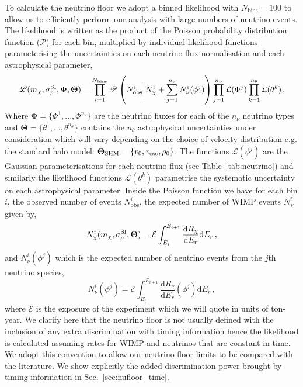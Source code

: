 To calculate the neutrino floor we adopt a binned likelihood with $N_\textrm{bins}=100$ to allow us to efficiently perform our analysis with large numbers of neutrino events. The likelihood is written as the product of the Poisson probability distribution function ($\mathscr{P}$) for each bin, multiplied by individual likelihood functions parameterising the uncertainties on each neutrino flux normalisation and each astrophysical parameter,
\begin{align}\label{eq:likelihood}
 \mathscr{L}(m_\chi,\sigma^{\rm SI}_p,\boldsymbol{\Phi},\boldsymbol{\Theta}) = \prod_{i=1}^{N_\textrm{bins}} \mathscr{P} \left(N_\textrm{obs}^i \bigg| N^i_\chi + \sum_{j=1}^{n_\nu} N^{i}_\nu(\phi^j)\right) 
\prod_{j=1}^{n_\nu} \mathcal{L}(\Phi^j)
\prod_{k=1}^{n_\theta} \mathcal{L}(\theta^k) \, .
\end{align}
Where $\boldsymbol{\Phi} = \{ \Phi^1, ..., \Phi^{n_\nu} \}$ are the neutrino fluxes for each of the $n_\nu$ neutrino types and $\boldsymbol{\Theta} = \{\theta^1, ..., \theta^{n_\theta} \}$ contains the $n_\theta$ astrophysical uncertainties under consideration which will vary depending on the choice of velocity distribution e.g. the standard halo model: $\boldsymbol{\Theta}_\textrm{SHM} = \{ v_0,v_{\rm esc},\rho_0 \}$. The functions $\mathcal{L}(\phi^j)$ are the Gaussian parameterisations for each neutrino flux (see Table~\ref{tab:neutrino}) and similarly the likelihood functions $\mathcal{L}(\theta^k)$ parametrise the systematic uncertainty on each astrophysical parameter. Inside the Poisson function we have for each bin $i$, the observed number of events $N_\textrm{obs}^i$, the expected number of WIMP events $N_\chi^i$ given by,
\begin{equation}\label{eq:nchi}
N_\chi^i(m_\chi,\sigma^{\rm SI}_p,\boldsymbol{\Theta}) =\mathcal{E}\int_{E_{i}}^{E_{i+1}} \frac{\textrm{d} R_\chi}{\textrm{d}E_r} \textrm{d}E_r \, ,
\end{equation}
and $N_\nu^i(\phi^j)$ which is the expected number of neutrino events from the $j$th neutrino species,
\begin{equation}
N^{i}_\nu (\phi^j) = \mathcal{E}\int_{E_{i}}^{E_{i+1}} \frac{\textrm{d} R_\nu}{\textrm{d}E_r}(\phi^j) \textrm{d}E_r \, ,
\end{equation}
where $\mathcal{E}$ is the exposure of the experiment which we will quote in units of ton-year. We clarify here that the neutrino floor is not usually defined with the inclusion of any extra discrimination with timing information hence the likelihood is calculated assuming rates for WIMP and neutrinos that are constant in time. We adopt this convention to allow our neutrino floor limits to be compared with the literature. We show explicitly the added discrimination power brought by timing information in Sec.~\ref{sec:nufloor_time}.

